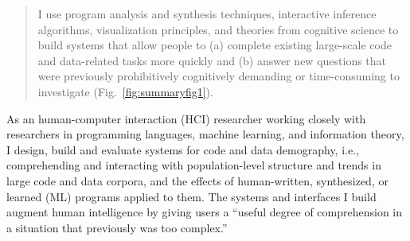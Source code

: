 \documentclass[justified]{tufte-handout}
\begin{document}
\begin{abstract}
I use program analysis and synthesis techniques, interactive inference algorithms, visualization principles, and theories from cognitive science to build systems that allow people to (a) complete existing large-scale code and data-related tasks more quickly and (b) answer new questions that were previously prohibitively cognitively demanding or time-consuming to investigate (Fig.~\ref{fig:summaryfig1}). %
\end{abstract}
As an human-computer interaction (HCI) researcher working closely with researchers in programming languages, machine learning, and information theory, I design, build and evaluate systems for code and data demography, i.e., comprehending and interacting with population-level structure and trends in large code and data corpora, and the effects of human-written, synthesized, or learned (ML) programs applied to them. 
The systems and interfaces I build augment human intelligence by giving users a ``useful degree of comprehension in a situation that previously was too complex.''\cite{engelbart1962} 
\end{document}
